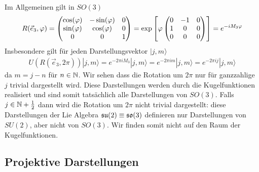 Im Allgemeinen gilt in $SO(3)$
\begin{align*}
    R(\vec{e}_3 , \varphi) =
    \begin{pmatrix}
        \cos(\varphi) & -\sin(\varphi) & 0 \\
        \sin(\varphi) & \cos(\varphi) & 0 \\
        0 & 0 & 1
    \end{pmatrix}
    = \exp \left[ \varphi \begin{pmatrix}
        0 & -1 & 0 \\ 1 & 0 & 0 \\ 0 & 0 & 0
    \end{pmatrix} \right] = e^{-i M_3 \varphi}
\end{align*}
Insbesondere gilt für jeden Darstellungsvektor $|j,m\rangle$
\begin{align*}
    U(R(\vec{e}_3 , 2 \pi)) |j,m\rangle = e^{-2 \pi i M_3} |j,m\rangle
    = e^{-2\pi i m} |j,m\rangle = e^{-2 \pi i j} |j,m\rangle
\end{align*}
da $m=j-n$ für $n \in \mathbb{N}$. Wir sehen dass die Rotation um $2 \pi$ nur für
ganzzahlige $j$ trivial dargestellt wird. Diese Darstellungen werden durch die
Kugelfunktionen realisiert und sind somit tatsächlich alle Darstellungen von $SO(3)$.
Falls $j \in \mathbb{N} + \frac{1}{2}$ dann wird die Rotation um $2 \pi$ nicht trivial
dargestellt: diese Darstellungen der Lie Algebra $\mathfrak{su}(2) \equiv \mathfrak{so}(3)$ definieren
nur Darstellungen von $SU(2)$, aber nicht von $SO(3)$. Wir finden somit nicht auf
den Raum der Kugelfunktionen.


\subsection{Projektive Darstellungen}

